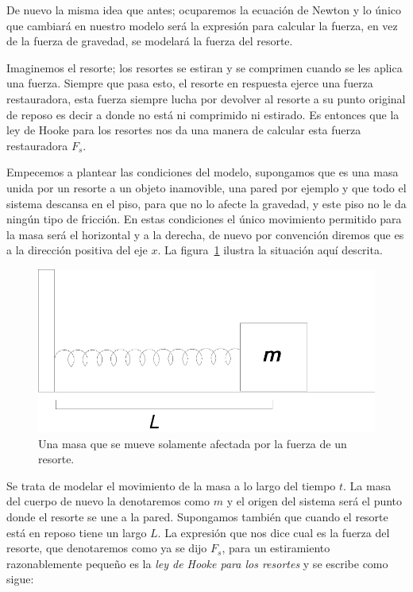 De nuevo la misma idea que antes; ocuparemos la ecuación de Newton y lo único que cambiará en nuestro modelo será la expresión para calcular la fuerza, en vez de la fuerza de gravedad, se modelará la fuerza del resorte.

Imaginemos el resorte; los resortes se estiran y se comprimen cuando se les aplica una fuerza. Siempre que pasa esto, el resorte en respuesta ejerce una fuerza restauradora, esta fuerza siempre lucha por devolver al resorte a su punto original de reposo es decir a donde no está ni comprimido ni estirado. Es entonces que la ley de Hooke para los resortes nos da una manera de calcular esta fuerza restauradora $F_s$.

Empecemos a plantear las condiciones del modelo, supongamos que es una masa unida por un resorte a un objeto inamovible, una pared por ejemplo y que todo el sistema descansa en el piso, para que no lo afecte la gravedad, y este piso no le da ningún tipo de fricción. En estas condiciones el único movimiento permitido para la masa será el horizontal y a la derecha, de nuevo por convención diremos que es a la dirección positiva del eje $x$. La figura~\ref{masaResorte:fig} ilustra la situación aquí descrita.

\begin{figure}
 \centering
 \includegraphics[]{Img/masa_resorte}
 \caption[Masa unida por un resorte]{ 
 Una masa que se mueve solamente afectada por la fuerza de un resorte.
 } \label{masaResorte:fig}
\end{figure}

Se trata de modelar el movimiento de la masa a lo largo del tiempo $t$. La masa del cuerpo de nuevo la denotaremos como $m$ y el origen del sistema será el punto donde el resorte se une a la pared. Supongamos también que cuando el resorte está en reposo tiene un largo $L$. La expresión que nos dice cual es la fuerza del resorte, que denotaremos como ya se dijo $F_s$, para un estiramiento razonablemente pequeño es la \emph{ley de Hooke para los resortes} y se escribe como sigue:

